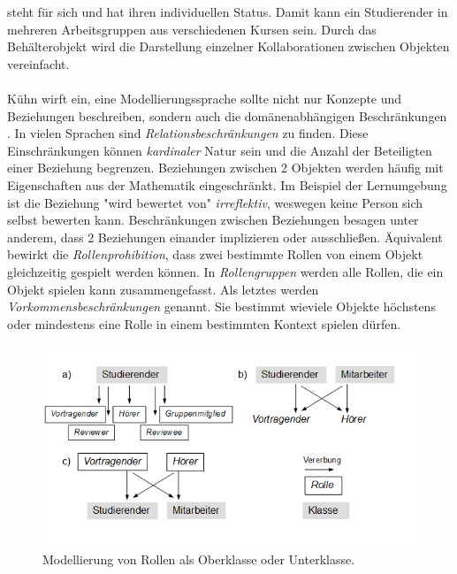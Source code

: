 \documentclass[conference]{IEEEtran}
\begin{document}
steht für sich und hat ihren individuellen Status. Damit kann ein Studierender in mehreren Arbeitsgruppen aus verschiedenen Kursen sein. Durch das Behälterobjekt wird die Darstellung einzelner Kollaborationen zwischen Objekten vereinfacht. \\\\ Kühn wirft ein, eine Modellierungssprache sollte nicht nur Konzepte und Beziehungen beschreiben, sondern auch die domänenabhängigen Beschränkungen \cite{family}. In vielen Sprachen sind \textit{Relationsbeschränkungen} zu finden. Diese Einschränkungen können \textit{kardinaler} Natur sein und die Anzahl der Beteiligten einer Beziehung begrenzen. Beziehungen zwischen 2 Objekten werden häufig mit Eigenschaften aus der Mathematik eingeschränkt. Im Beispiel der Lernumgebung ist die Beziehung "wird bewertet von" \textit{irreflektiv}, weswegen keine Person sich selbst bewerten kann. Beschränkungen zwischen Beziehungen besagen unter anderem, dass 2 Beziehungen einander implizieren oder ausschließen. Äquivalent bewirkt die \textit{Rollenprohibition}, dass zwei bestimmte Rollen von einem Objekt gleichzeitig gespielt werden können. In \textit{Rollengruppen} werden alle Rollen, die ein Objekt spielen kann zusammengefasst. Als letztes werden \textit{Vorkommensbeschränkungen} genannt. Sie bestimmt wieviele Objekte höchstens oder mindestens eine Rolle in einem bestimmten Kontext spielen dürfen.\\ 



\begin{figure}
\includegraphics[scale=0.6]{Images/OomRoleProblems.PNG}
\caption{Modellierung von Rollen als Oberklasse oder Unterklasse.}
\end{figure}
\end{document}
